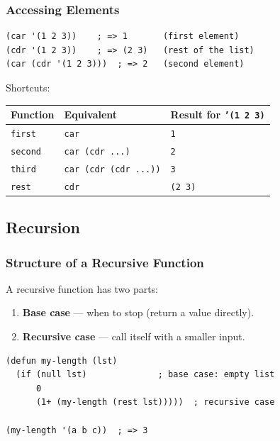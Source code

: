 \subsubsection{Accessing Elements}

\begin{lstlisting}
(car '(1 2 3))    ; => 1       (first element)
(cdr '(1 2 3))    ; => (2 3)   (rest of the list)
(car (cdr '(1 2 3)))  ; => 2   (second element)
\end{lstlisting}

Shortcuts:

\begin{center}
\begin{tabular}{lll}
  \toprule
  \textbf{Function} & \textbf{Equivalent} & \textbf{Result for \texttt{'(1 2 3)}} \\
  \midrule
  \texttt{first}  & \texttt{car}             & \texttt{1} \\
  \texttt{second} & \texttt{car (cdr ...)}   & \texttt{2} \\
  \texttt{third}  & \texttt{car (cdr (cdr ...))} & \texttt{3} \\
  \texttt{rest}   & \texttt{cdr}             & \texttt{(2 3)} \\
  \bottomrule
\end{tabular}
\end{center}

\subsection{Recursion}

\subsubsection{Structure of a Recursive Function}

A recursive function has two parts:
\begin{enumerate}
  \item \textbf{Base case} --- when to stop (return a value directly).
  \item \textbf{Recursive case} --- call itself with a smaller input.
\end{enumerate}

\begin{lstlisting}
(defun my-length (lst)
  (if (null lst)              ; base case: empty list
      0
      (1+ (my-length (rest lst)))))  ; recursive case

(my-length '(a b c))  ; => 3
\end{lstlisting}

